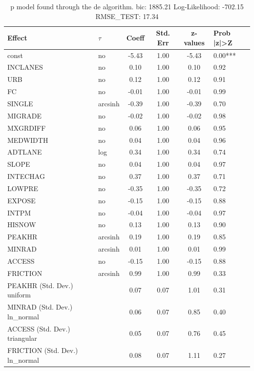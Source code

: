 \begin{table}
	\caption{p model found through the de algorithm. bic: 1885.21 Log-Likelihood: -702.15 RMSE_TEST: 17.34}
	\begin{center}
		\begin{tabular}{|l|l|c|c|c|l|}
			\hline
			Effect & $\tau$ & Coeff & Std. Err & z-values & Prob |z|>Z \\
			\hline
			const & no & -5.43 & 1.00 & -5.43 & 0.00*** \\
			\hline
			INCLANES & no & 0.10 & 1.00 & 0.10 & 0.92 \\
			\hline
			URB & no & 0.12 & 1.00 & 0.12 & 0.91 \\
			\hline
			FC & no & -0.01 & 1.00 & -0.01 & 0.99 \\
			\hline
			SINGLE & arcsinh & -0.39 & 1.00 & -0.39 & 0.70 \\
			\hline
			MIGRADE & no & -0.02 & 1.00 & -0.02 & 0.98 \\
			\hline
			MXGRDIFF & no & 0.06 & 1.00 & 0.06 & 0.95 \\
			\hline
			MEDWIDTH & no & 0.04 & 1.00 & 0.04 & 0.96 \\
			\hline
			ADTLANE & log & 0.34 & 1.00 & 0.34 & 0.74 \\
			\hline
			SLOPE & no & 0.04 & 1.00 & 0.04 & 0.97 \\
			\hline
			INTECHAG & no & 0.37 & 1.00 & 0.37 & 0.71 \\
			\hline
			LOWPRE & no & -0.35 & 1.00 & -0.35 & 0.72 \\
			\hline
			EXPOSE & no & -0.15 & 1.00 & -0.15 & 0.88 \\
			\hline
			INTPM & no & -0.04 & 1.00 & -0.04 & 0.97 \\
			\hline
			HISNOW & no & 0.13 & 1.00 & 0.13 & 0.90 \\
			\hline
			PEAKHR & arcsinh & 0.19 & 1.00 & 0.19 & 0.85 \\
			\hline
			MINRAD & arcsinh & 0.01 & 1.00 & 0.01 & 0.99 \\
			\hline
			ACCESS & no & -0.15 & 1.00 & -0.15 & 0.88 \\
			\hline
			FRICTION & arcsinh & 0.99 & 1.00 & 0.99 & 0.33 \\
			\hline
			PEAKHR (Std. Dev.) uniform &  & 0.07 & 0.07 & 1.01 & 0.31 \\
			\hline
			MINRAD (Std. Dev.) ln_normal &  & 0.06 & 0.07 & 0.85 & 0.40 \\
			\hline
			ACCESS (Std. Dev.) triangular &  & 0.05 & 0.07 & 0.76 & 0.45 \\
			\hline
			FRICTION (Std. Dev.) ln_normal &  & 0.08 & 0.07 & 1.11 & 0.27 \\
			\hline
		\end{tabular}
	\end{center}
\end{table}
